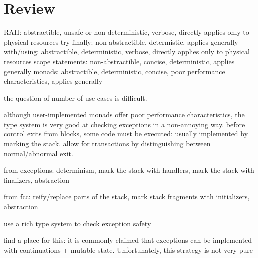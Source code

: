 \documentclass[11pt]{article}
\begin{document}
\section{Review}
\label{sec:review}





RAII: abstractible, unsafe or non-deterministic, verbose, directly applies only to physical resources
try-finally: non-abstractible, determistic, applies generally
with/using: abstractible, deterministic, verbose, directly applies only to physical resources
scope statements: non-abstractible, concise, deterministic, applies generally
monads: abstractible, deterministic, concise, poor performance characteristics, applies generally

the question of number of use-cases is difficult.

although user-implemented monads offer poor performance characteristics, the type system is very good at checking exceptions in a non-annoying way.
before control exits from blocks, some code must be executed: usually implemented by marking the stack.
allow for transactions by distinguishing between normal/abnormal exit.



from exceptions: determinism, mark the stack with handlers, mark the stack with finalizers, abstraction

from fcc: reify/replace parts of the stack, mark stack fragments with initializers, abstraction

use a rich type system to check exception safety

find a place for this: it is commonly claimed that exceptions can be implemented with continuations + mutable state. Unfortunately, this strategy is not very pure
\end{document}
